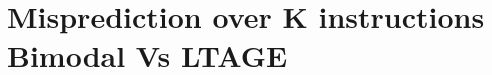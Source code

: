 \documentclass[10pt,a4paper]{article}
\begin{document}
\section{Misprediction over K instructions Bimodal Vs LTAGE}
\begin{figure}[!htb]
\centering
{}
\end{figure}
\end{document}
